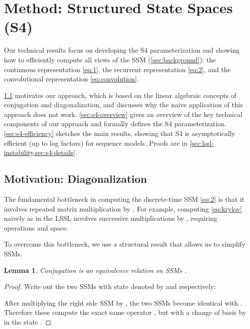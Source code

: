 \documentclass{article}
\newtheorem{lemma}{Lemma}[section]
\newcommand{\methodabbrv}{S4}
\begin{document}
\section{Method: Structured State Spaces (\methodabbrv)}
\label{sec:s4}

Our technical results focus on developing the \methodabbrv{} parameterization and showing how to efficiently compute all views of the SSM (\cref{sec:background}):
the continuous representation  \eqref{eq:1},
the recurrent representation  \eqref{eq:2},
and the convolutional representation  \eqref{eq:convolution}.


\cref{sec:s4-motivation} motivates our approach, which is based on the linear algebraic concepts of conjugation and diagonalization, and discusses why the naive application of this approach does not work.
\cref{sec:s4-overview} gives an overview of the key technical components of our approach and formally defines the \methodabbrv{} parameterization.
\cref{sec:s4-efficiency} sketches the main results, showing that \methodabbrv{} is asymptotically efficient (up to log factors) for sequence models.
Proofs are in \cref{sec:lssl-instability,sec:s4-details}.






















\subsection{Motivation: Diagonalization}
\label{sec:s4-motivation}

The fundamental bottleneck in computing the discrete-time SSM \eqref{eq:2} is that it involves repeated matrix multiplication by .
For example, computing \eqref{eq:krylov} naively as in the LSSL involves  successive multiplications by , requiring  operations and  space.

To overcome this bottleneck, we use a structural result that allows us to simplify SSMs.
\begin{lemma}\label{lmm:conjugation}
  Conjugation is an equivalence relation on SSMs \small .
\end{lemma}
\begin{proof}Write out the two SSMs with state denoted by  and  respectively:
  
  After multiplying the right side SSM by , the two SSMs become identical with .
  Therefore these compute the exact same operator , but with a change of basis by  in the state .
\end{proof}
\end{document}
